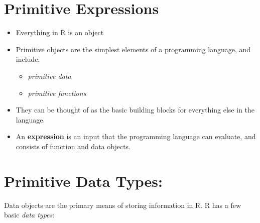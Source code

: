 \documentclass[
]{book}
\providecommand{\tightlist}{%
  \setlength{\itemsep}{0pt}\setlength{\parskip}{0pt}}
\begin{document}
\hypertarget{primitive-expressions}{%
\section{Primitive Expressions}\label{primitive-expressions}}

\begin{itemize}
\item
  Everything in R is an object
\item
  Primitive objects are the simplest elements of a programming language, and include:

  \begin{itemize}
  \tightlist
  \item
    \emph{primitive data}
  \item
    \emph{primitive functions}
  \end{itemize}
\item
  They can be thought of as the basic building blocks for everything else in the language.
\item
  An \textbf{expression} is an input that the programming language can evaluate, and consists of function and data objects.
\end{itemize}

\hypertarget{primitive-data-types}{%
\section{Primitive Data Types:}\label{primitive-data-types}}

Data objects are the primary means of storing information in R.
R has a few basic \emph{data types}:
\end{document}

